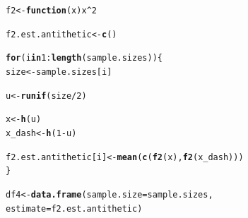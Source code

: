 \documentclass[11pt, a4paper]{article}\usepackage[]{graphicx}\usepackage[]{xcolor}
\makeatletter
\newcommand{\hlnum}[1]{\textcolor[rgb]{0.686,0.059,0.569}{#1}}%
\newcommand{\hlopt}[1]{\textcolor[rgb]{0,0,0}{#1}}%
\newcommand{\hldef}[1]{\textcolor[rgb]{0.345,0.345,0.345}{#1}}%
\newcommand{\hlkwa}[1]{\textcolor[rgb]{0.161,0.373,0.58}{\textbf{#1}}}%
\newcommand{\hlkwb}[1]{\textcolor[rgb]{0.69,0.353,0.396}{#1}}%
\newcommand{\hlkwc}[1]{\textcolor[rgb]{0.333,0.667,0.333}{#1}}%
\newcommand{\hlkwd}[1]{\textcolor[rgb]{0.737,0.353,0.396}{\textbf{#1}}}%
\newenvironment{kframe}{%
 \def\at@end@of@kframe{}%
 \ifinner\ifhmode%
  \def\at@end@of@kframe{\end{minipage}}%
  \begin{minipage}{\columnwidth}%
 \fi\fi%
 \def\FrameCommand##1{\hskip\@totalleftmargin \hskip-\fboxsep
 \colorbox{shadecolor}{##1}\hskip-\fboxsep
     \hskip-\linewidth \hskip-\@totalleftmargin \hskip\columnwidth}%
 \MakeFramed {\advance\hsize-\width
   \@totalleftmargin\z@ \linewidth\hsize
   \@setminipage}}%
 {\par\unskip\endMakeFramed%
 \at@end@of@kframe}
\newenvironment{knitrout}{}{} %
\makeatother
\begin{document}
\begin{enumerate}
\begin{knitrout}
\color{fgcolor}\begin{kframe}
\begin{alltt}
\hldef{f2} \hlkwb{<-} \hlkwa{function}\hldef{(}\hlkwc{x}\hldef{) x}\hlopt{^}\hlnum{2}
\end{alltt}
\end{kframe}
\end{knitrout}

\begin{knitrout}
\color{fgcolor}\begin{kframe}
\begin{alltt}
\hldef{f2.est.antithetic} \hlkwb{<-} \hlkwd{c}\hldef{()}

\hlkwa{for} \hldef{(i} \hlkwa{in} \hlnum{1}\hlopt{:}\hlkwd{length}\hldef{(sample.sizes)) \{}
  \hldef{size} \hlkwb{<-} \hldef{sample.sizes[i]}

  \hldef{u} \hlkwb{<-} \hlkwd{runif}\hldef{(size}\hlopt{/}\hlnum{2}\hldef{)}

  \hldef{x} \hlkwb{<-} \hlkwd{h}\hldef{(u)}
  \hldef{x_dash} \hlkwb{<-} \hlkwd{h}\hldef{(}\hlnum{1} \hlopt{-} \hldef{u)}

  \hldef{f2.est.antithetic[i]} \hlkwb{<-} \hlkwd{mean}\hldef{(}\hlkwd{c}\hldef{(}\hlkwd{f2}\hldef{(x),} \hlkwd{f2}\hldef{(x_dash)))}
\hldef{\}}
\end{alltt}
\end{kframe}
\end{knitrout}

\begin{knitrout}
\color{fgcolor}\begin{kframe}
\begin{alltt}
\hldef{df4} \hlkwb{<-} \hlkwd{data.frame}\hldef{(}\hlkwc{sample.size} \hldef{= sample.sizes,}
                  \hlkwc{estimate} \hldef{= f2.est.antithetic)}
\end{alltt}
\end{kframe}
\end{knitrout}




\end{enumerate}
\end{document}
